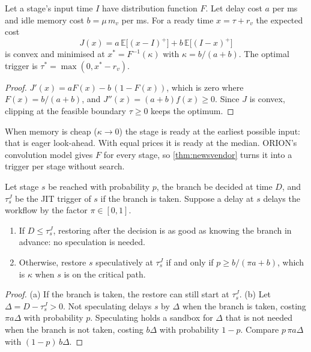 \begin{theorem}
\label{thm:newsvendor}
Let a stage's input time $I$ have distribution function $F$. Let delay cost $a$ per ms and idle
memory cost $b = \mu\,m_v$ per ms. For a ready time $x = \tau + r_v$ the expected cost
\[
  J(x) = a\,\mathbb{E}\bigl[(x - I)^+\bigr] + b\,\mathbb{E}\bigl[(I - x)^+\bigr]
\]
is convex and minimised at $x^* = F^{-1}(\kappa)$ with $\kappa = b/(a + b)$. The optimal
trigger is $\tau^* = \max(0, x^* - r_v)$.
\end{theorem}

\begin{proof}
$J'(x) = a F(x) - b\,(1 - F(x))$, which is zero where $F(x) = b/(a + b)$, and
$J''(x) = (a + b) f(x) \ge 0$. Since $J$ is convex, clipping at the feasible boundary
$\tau \ge 0$ keeps the optimum.
\end{proof}

When memory is cheap ($\kappa \to 0$) the stage is ready at the earliest possible input:
that is eager look-ahead. With equal prices it is ready at the median. ORION's convolution
model \cite{orion2022} gives $F$ for every stage, so \cref{thm:newsvendor} turns it into a
trigger per stage without search.

\begin{theorem}
\label{thm:branch}
Let stage $s$ be reached with probability $p$, the branch be decided at time $D$, and
$\tau^{J}_s$ be the JIT trigger of $s$ if the branch is taken. Suppose a delay at $s$ delays the
workflow by the factor $\pi \in [0, 1]$.
\begin{enumerate}[label=(\alph*)]
  \item If $D \le \tau^{J}_s$, restoring after the decision is as good as knowing the branch in
        advance: no speculation is needed.
  \item Otherwise, restore $s$ speculatively at $\tau^{J}_s$ if and only if
        $p \ge b / (\pi a + b)$, which is $\kappa$ when $s$ is on the critical path.
\end{enumerate}
\end{theorem}

\begin{proof}
(a) If the branch is taken, the restore can still start at $\tau^J_s$. (b) Let
$\Delta = D - \tau^J_s > 0$. Not speculating delays $s$ by $\Delta$ when the branch is taken,
costing $\pi a \Delta$ with probability $p$. Speculating holds a sandbox for $\Delta$ that is
not needed when the branch is not taken, costing $b \Delta$ with probability $1 - p$. Compare
$p\,\pi a \Delta$ with $(1 - p)\,b \Delta$.
\end{proof}

